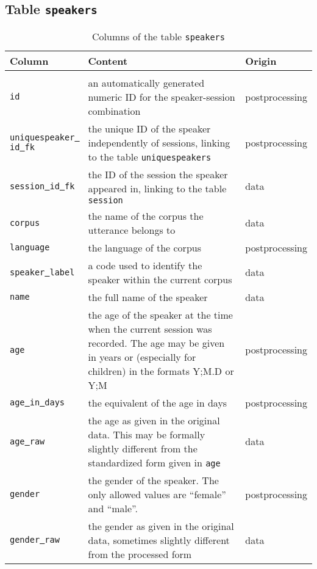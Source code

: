 \documentclass[a4paper, 11pt]{book}
\newcommand{\und}{\underline{{ }}\hspace{0.2mm}}	%
\begin{document}
\subsection{Table \texttt{speakers}}
\label{subsec:Table speakers}

\begin{longtable}{lp{.5\linewidth}p{.2\linewidth}}
	\toprule
		\textbf{Column} & \textbf{Content} 	& \textbf{Origin} \\
	\midrule
	\endhead
	
	\bottomrule\\[-0.15cm]
	\caption{Columns of the table \texttt{speakers}}
	\endfoot
	
		\texttt{id}				& an automatically generated numeric ID for the speaker-session combination & postprocessing \\
		\texttt{uniquespeaker\und id\und fk} & the unique ID of the speaker independently of sessions, linking to the table \texttt{uniquespeakers} & postprocessing \\
		\texttt{session\und id\und fk} & the ID of the session the speaker appeared in, linking to the table \texttt{session} & data \\
		\texttt{corpus}			& the name of the corpus the utterance belongs to & data \\
		\texttt{language}		& the language of the corpus & postprocessing \\
		\texttt{speaker\und label} & a code used to identify the speaker within the current corpus & data \\
		\texttt{name} 			& the full name of the speaker & data \\
		\texttt{age} 			& the age of the speaker at the time when the current session was recorded. The age may be given in years
			 					  or (especially for children) in the formats Y;M.D or Y;M & postprocessing \\
		\texttt{age\und in\und days} & the equivalent of the age in days & postprocessing \\
		\texttt{age\und raw} 	& the age as given in the original data. This may be formally slightly different from the standardized form
			 					  given in \texttt{age} & data \\
		\texttt{gender} 		& the gender of the speaker. The only allowed values are “female” and “male”. & postprocessing \\
		\texttt{gender\und raw} & the gender as given in the original data, sometimes slightly different from the processed form & data \\

\end{longtable}
\end{document}
